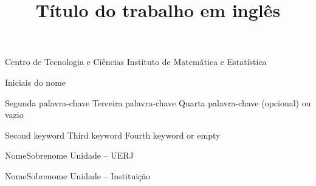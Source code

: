 



            {Centro de Tecnologia e Ciências} 
            {Instituto de Matemática e Estatística} 



      {Iniciais do nome} %

\title{Título do trabalho em inglês}

               {Segunda palavra-chave}
               {Terceira palavra-chave}
               {Quarta palavra-chave (opcional) ou vazio}

         {Second keyword}
         {Third keyword}
         {Fourth keyword or empty}

           {Nome}{Sobrenome} 
           {Unidade -- UERJ} 

             {Nome}{Sobrenome} 
             {Unidade -- Instituição} 







